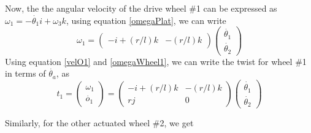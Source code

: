 Now, the the angular velocity of the drive wheel \#1 can be expressed as $\omega_1=-\dot{\theta_1}i+\omega_3k$, using equation \ref{omegaPlat}, we can write 
\begin{equation}
\label{omegaWheel1}
\omega_1=\begin{pmatrix}
-i+(r/l)k & -(r/l)k
\end{pmatrix}
\begin{pmatrix}
\dot{\theta_1}\\\dot{\theta_2}
\end{pmatrix}
\end{equation}
Using equation \ref{velO1} and \ref{omegaWheel1}, we can write the twist for wheel \#1 in terms of $\dot{\theta_a}$, as 
\begin{equation}
\label{twist1}
t_1=\begin{pmatrix}
\omega_1\\\dot{o_1}
\end{pmatrix}=
\begin{pmatrix}
-i+(r/l)k & -(r/l)k\\ rj & 0
\end{pmatrix}
\begin{pmatrix}
\dot{\theta_1}\\\dot{\theta_2}
\end{pmatrix}
\end{equation}

Similarly, for the other actuated wheel \#2, we get


